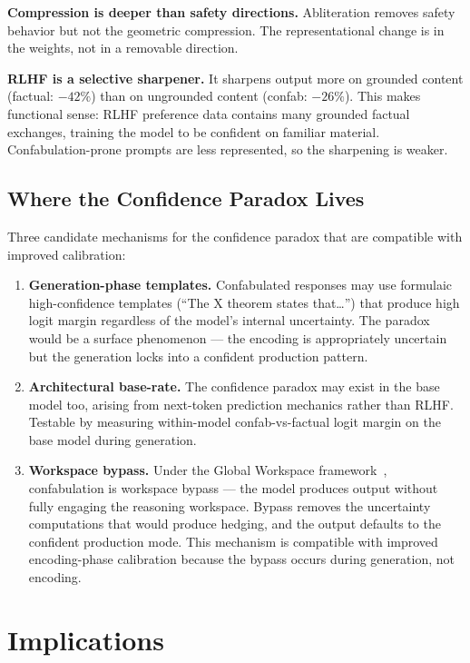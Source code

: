 \documentclass[11pt,a4paper]{article}
\begin{document}
\textbf{Compression is deeper than safety directions.} Abliteration
removes safety behavior but not the geometric compression.
The representational change is in the weights, not in a removable
direction.

\textbf{RLHF is a selective sharpener.} It sharpens output more on
grounded content (factual: $-42\%$) than on ungrounded content
(confab: $-26\%$). This makes functional sense: RLHF preference
data contains many grounded factual exchanges, training the model
to be confident on familiar material. Confabulation-prone prompts
are less represented, so the sharpening is weaker.

\subsection{Where the Confidence Paradox Lives}

Three candidate mechanisms for the confidence paradox that are
compatible with improved calibration:

\begin{enumerate}[nosep]
\item \textbf{Generation-phase templates.} Confabulated responses
  may use formulaic high-confidence templates (``The X theorem
  states that\ldots'') that produce high logit margin regardless
  of the model's internal uncertainty. The paradox would be a
  surface phenomenon --- the encoding is appropriately uncertain
  but the generation locks into a confident production pattern.
\item \textbf{Architectural base-rate.} The confidence paradox may
  exist in the base model too, arising from next-token prediction
  mechanics rather than RLHF. Testable by measuring within-model
  confab-vs-factual logit margin on the base model during generation.
\item \textbf{Workspace bypass.} Under the Global Workspace
  framework~\citep{gurnee2026gwt}, confabulation is workspace
  bypass --- the model produces output without fully engaging the
  reasoning workspace. Bypass removes the uncertainty computations
  that would produce hedging, and the output defaults to the
  confident production mode. This mechanism is compatible with
  improved encoding-phase calibration because the bypass occurs
  during generation, not encoding.
\end{enumerate}

\section{Implications}
\label{sec:implications}
\end{document}
